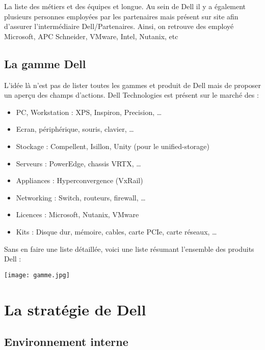 \documentclass{bredele} %
\begin{document}
    La liste des métiers et des équipes et longue. Au sein de Dell il y a également plusieurs personnes employées par les partenaires mais présent sur site afin d’assurer l’intermédiaire Dell/Partenaires. Ainsi, on retrouve des employé Microsoft, APC Schneider, VMware, Intel, Nutanix, etc

    \section{La gamme Dell}
        L’idée là n’est pas de lister toutes les gammes et produit de Dell mais de proposer un aperçu des champs d’actions.
        Dell Technologies est présent sur le marché des :
        \begin{itemize}
            \item PC, Workstation : XPS, Inspiron, Precision, …
            \item Ecran, périphérique, souris, clavier, …
            \item Stockage : Compellent, Isillon, Unity (pour le unified-storage)
            \item Serveurs : PowerEdge, chassis VRTX, …
            \item Appliances : Hyperconvergence (VxRail)
            \item Networking : Switch, routeurs, firewall, …
            \item Licences : Microsoft, Nutanix, VMware
            \item Kits : Disque dur, mémoire, cables, carte PCIe, carte réseaux, …
        \end{itemize}
        Sans en faire une liste détaillée, voici une liste résumant l’ensemble des produits Dell :
        \begin{center}
            \texttt{[image: gamme.jpg]}
        \end{center}

\chapter{La stratégie de Dell}
            \section{Environnement interne}
\end{document}
